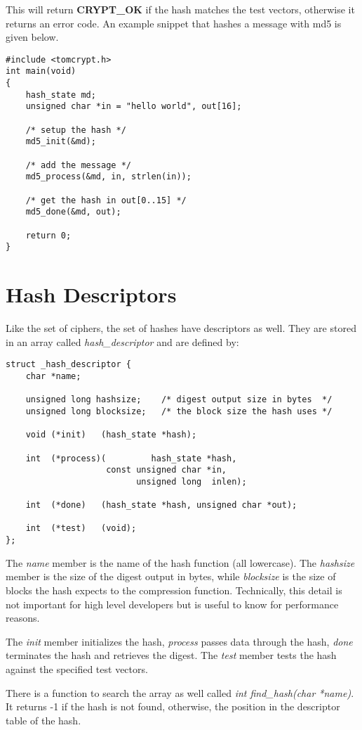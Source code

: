 \documentclass[synpaper]{book}
\newcommand{\mysection}[1]    %
	{                   %
	\section{#1}
   \markboth{\textsf{www.libtom.org}}{\thesection ~ {#1}}
	}
\begin{document}
This will return {\bf CRYPT\_OK} if the hash matches the test vectors, otherwise it returns an error code.  An
example snippet that hashes a message with md5 is given below.
\begin{small}
\begin{verbatim}
#include <tomcrypt.h>
int main(void)
{
    hash_state md;
    unsigned char *in = "hello world", out[16];

    /* setup the hash */
    md5_init(&md);

    /* add the message */
    md5_process(&md, in, strlen(in));

    /* get the hash in out[0..15] */
    md5_done(&md, out);

    return 0;
}
\end{verbatim}
\end{small}

\mysection{Hash Descriptors}
Like the set of ciphers, the set of hashes have descriptors as well.  They are stored in an array called \textit{hash\_descriptor} and
are defined by:
\begin{verbatim}
struct _hash_descriptor {
    char *name;

    unsigned long hashsize;    /* digest output size in bytes  */
    unsigned long blocksize;   /* the block size the hash uses */

    void (*init)   (hash_state *hash);

    int  (*process)(         hash_state *hash,
                    const unsigned char *in,
                          unsigned long  inlen);

    int  (*done)   (hash_state *hash, unsigned char *out);

    int  (*test)   (void);
};
\end{verbatim}

The \textit{name} member is the name of the hash function (all lowercase).  The \textit{hashsize} member is the size of the digest output
in bytes, while \textit{blocksize} is the size of blocks the hash expects to the compression function.  Technically, this detail is not important
for high level developers but is useful to know for performance reasons.

The \textit{init} member initializes the hash, \textit{process} passes data through the hash, \textit{done} terminates the hash and retrieves the
digest.  The \textit{test} member tests the hash against the specified test vectors.

There is a function to search the array as well called \textit{int find\_hash(char *name)}.  It returns -1 if the hash is not found, otherwise, the
position in the descriptor table of the hash.
\end{document}
